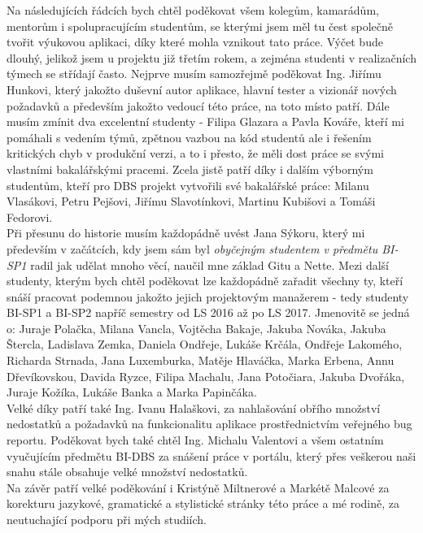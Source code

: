 Na následujících řádcích bych chtěl poděkovat všem kolegům, kamarádům, mentorům i spolupracujícím studentům, se kterými jsem měl tu čest společně tvořit výukovou aplikaci, díky které mohla vznikout tato práce. Výčet bude dlouhý, jelikož jsem u projektu již třetím rokem, a zejména studenti v realizačních týmech se střídají často. Nejprve musím samozřejmě poděkovat Ing. Jiřímu Hunkovi, který jakožto duševní autor aplikace, hlavní tester a vizionář nových požadavků a především jakožto vedoucí této práce, na toto místo patří. Dále musím zmínit dva excelentní studenty - Filipa Glazara a Pavla Kováře, kteří mi pomáhali s vedením týmů, zpětnou vazbou na kód studentů ale i řešením kritických chyb v produkční verzi, a to i přesto, že měli dost práce se svými vlastními bakalářskými pracemi. Zcela jistě patří díky i dalším výborným studentům, kteří pro DBS projekt vytvořili své bakalářské práce: Milanu Vlasákovi, Petru Pejšovi, Jiřímu Slavotínkovi, Martinu Kubišovi a Tomáši Fedorovi.\\
Při přesunu do historie musím každopádně uvést Jana Sýkoru, který mi především v začátcích, kdy jsem sám byl \emph{obyčejným studentem v předmětu BI-SP1} radil jak udělat mnoho věcí, naučil mne základ Gitu a Nette. Mezi další studenty, kterým bych chtěl poděkovat lze každopádně zařadit všechny ty, kteří snáší pracovat podemnou jakožto jejich projektovým manažerem - tedy studenty BI-SP1 a BI-SP2 napříč semestry od LS 2016 až po LS 2017. Jmenovitě se jedná o: Juraje Polačka, Milana Vancla, Vojtěcha Bakaje, Jakuba Nováka, Jakuba Štercla, Ladislava Zemka, Daniela Ondřeje, Lukáše Krčála, Ondřeje Lakomého, Richarda Strnada, Jana Luxemburka, Matěje Hlaváčka, Marka Erbena, Annu Dřevíkovskou, Davida Ryzce, Filipa Machalu, Jana Potočiara, Jakuba Dvořáka, Juraje Kožíka, Lukáše Banka a Marka Papinčáka.\\
Velké díky patří také Ing. Ivanu Halaškovi, za nahlašování obřího množství nedostatků a požadavků na funkcionalitu aplikace prostřednictvím veřejného bug reportu. Poděkovat bych také chtěl Ing. Michalu Valentovi a všem ostatním vyučujícím předmětu BI-DBS za snášení práce v portálu, který přes veškerou naši snahu stále obsahuje velké množství nedostatků.\\
Na závěr patří velké poděkování i Kristýně Miltnerové a Markétě Malcové za korekturu jazykové, gramatické a stylistické stránky této práce a mé rodině, za neutuchající podporu při mých studiích.
